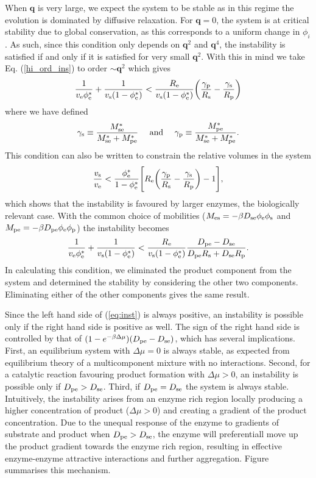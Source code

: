 When $\bm{q}$ is very large, we expect the system to be stable as in this regime the evolution is dominated by diffusive relaxation. For $\bm{q} = 0$, the system is at critical stability due to global conservation, as this corresponds to a uniform change in $\phi_i$. As such, since this condition only depends on $\bm{q}^2$ and $\bm{q}^4$, the instability is satisfied if and only if it is satisfied for very small $\bm{q}^2$. With this in mind we take Eq. (\ref{hi_ord_ins}) to order $\sim\bm{q}^2$ which gives
\begin{align}
    \frac{1}{v_{\mathrm{e}}\phi_{\mathrm{e}}^*}+\frac{1}{v_{\mathrm{s}}(1-\phi_{\mathrm{e}}^*)} < \frac{R_\mathrm{e} }{v_{\mathrm{s}}(1-\phi_{\mathrm{e}}^*)}\bigg(\frac{\gamma_\mathrm{p}}{R_\mathrm{s} }-\frac{\gamma_\mathrm{s}}{R_\mathrm{p} }\bigg)
    \label{eq_form_cond}
\end{align}
where we have defined
\begin{equation}
    \gamma_\mathrm{s} \equiv \frac{M_{\mathrm{se}}^*}{M_{\mathrm{se}}^*+M_{\mathrm{pe}}^*} \quad \text{   and    } \quad \gamma_\mathrm{p} \equiv \frac{M_{\mathrm{pe}}^*}{M_{\mathrm{se}}^*+M_{\mathrm{pe}}^*}.
\end{equation}
This condition can also be written to constrain the relative volumes in the system
\begin{equation}
    \frac{v_{\mathrm{s}}}{v_{\mathrm{e}}} < \frac{\phi_{\mathrm{e}}^*}{1-\phi_{\mathrm{e}}^*}\Bigg[R_\mathrm{e} \bigg(\frac{\gamma_\mathrm{p}}{R_\mathrm{s} }-\frac{\gamma_\mathrm{s}}{R_\mathrm{p} }\bigg) - 1\Bigg],
    \label{vol_ins}
\end{equation}
which shows that the instability is favoured by larger enzymes, the biologically relevant case. With the common choice of mobilities ($M_{\mathrm{es}} = -\beta D_{\mathrm{se}}\phi_{\mathrm{e}}\phi_{\mathrm{s}}$ and $M_{\mathrm{pe}} = -\beta D_{\mathrm{pe}}\phi_{\mathrm{e}}\phi_{\mathrm{p}}$) the instability becomes
\begin{equation}
    \frac{1}{v_{\mathrm{e}}\phi_{\mathrm{e}}^*}+\frac{1}{v_{\mathrm{s}}(1-\phi_{\mathrm{e}}^*)} < \frac{R_\mathrm{e} }{v_{\mathrm{s}}(1-\phi_{\mathrm{e}}^*)}\frac{D_{\mathrm{pe}}-D_{\mathrm{se}}}{D_{\mathrm{pe}}R_\mathrm{s} +D_{\mathrm{se}}R_\mathrm{p} }. \label{eq:inst}
\end{equation}
In calculating this condition, we eliminated the product component from the system and determined the stability by considering the other two components. Eliminating either of the other components gives the same result.

Since the left hand side of (\ref{eq:inst}) is always positive, an instability is possible only if the right hand side is positive as well. The sign of the right hand side is controlled by that of $(1-e^{-\beta\Delta \mu})(D_{\mathrm{pe}}-D_{\mathrm{se}})$, which has several implications. First, an equilibrium system with $\Delta\mu=0$ is always stable, as expected from equilibrium theory of a multicomponent mixture with no interactions. Second, for a catalytic reaction favouring product formation with $\Delta \mu>0$, an instability is possible only if $D_{\mathrm{pe}}>D_{\mathrm{se}}$. Third, if $D_{\mathrm{pe}}=D_{\mathrm{se}}$ the system is always stable. Intuitively, the instability arises from an enzyme rich region locally producing a higher concentration of product ($\Delta \mu > 0$) and creating a gradient of the product concentration. Due to the unequal response of the enzyme to gradients of substrate and product when $D_{\mathrm{pe}}>D_{\mathrm{se}}$, the enzyme will preferentiall move up the product gradient towards the enzyme rich region, resulting in effective enzyme-enzyme attractive interactions and further aggregation. Figure  summarises this mechanism.

